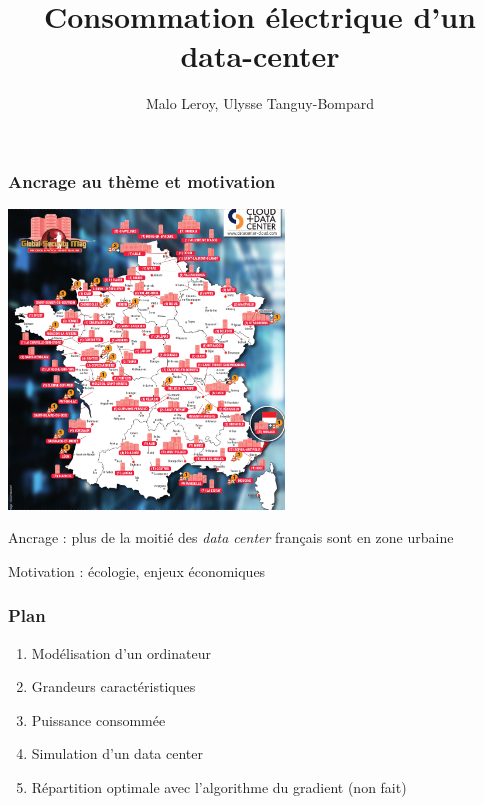 \documentclass[a4paper,11pt]{beamer}
\title{Consommation électrique d'un data-center}
\author{Malo Leroy, Ulysse Tanguy-Bompard}
\begin{document}

\maketitle %


\begin{frame}
\frametitle{Ancrage au thème et motivation}

\includegraphics[width=0.55\textwidth]{carte_data_center.png}

Ancrage : plus de la moitié des \textit{data center} français sont en zone urbaine

Motivation : écologie, enjeux économiques
\end{frame}

\begin{frame}
    \frametitle{Plan}
    \begin{enumerate}
        \item Modélisation d'un ordinateur
        \item Grandeurs caractéristiques
        \item Puissance consommée
        \item Simulation d'un data center
        \item Répartition optimale avec l'algorithme du gradient (non fait)
    \end{enumerate}
\end{frame}
\end{document}
